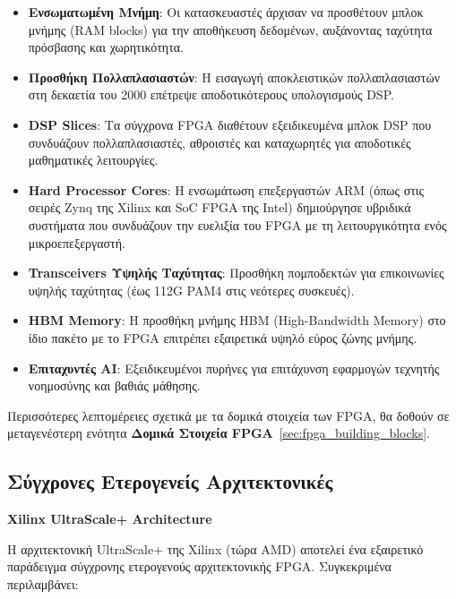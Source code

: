 \begin{itemize}
  \item \textbf{Ενσωματωμένη Μνήμη}: Οι κατασκευαστές άρχισαν να προσθέτουν μπλοκ μνήμης (RAM blocks) για την αποθήκευση δεδομένων, αυξάνοντας ταχύτητα πρόσβασης και χωρητικότητα.
  
  \item \textbf{Προσθήκη Πολλαπλασιαστών}: Η εισαγωγή αποκλειστικών πολλαπλασιαστών στη δεκαετία του 2000 επέτρεψε αποδοτικότερους υπολογισμούς DSP.
  
  \item \textbf{DSP Slices}: Τα σύγχρονα FPGA διαθέτουν εξειδικευμένα μπλοκ DSP που συνδυάζουν πολλαπλασιαστές, αθροιστές και καταχωρητές για αποδοτικές μαθηματικές λειτουργίες.
  
  \item \textbf{Hard Processor Cores}: Η ενσωμάτωση επεξεργαστών ARM (όπως στις σειρές Zynq της Xilinx και SoC FPGA της Intel) δημιούργησε υβριδικά συστήματα που συνδυάζουν την ευελιξία του FPGA με τη λειτουργικότητα ενός μικροεπεξεργαστή.
  
  \item \textbf{Transceivers Υψηλής Ταχύτητας}: Προσθήκη πομποδεκτών για επικοινωνίες υψηλής ταχύτητας (έως 112G PAM4 στις νεότερες συσκευές).
  
  \item \textbf{HBM Memory}: Η προσθήκη μνήμης HBM (High-Bandwidth Memory) στο ίδιο πακέτο με το FPGA επιτρέπει εξαιρετικά υψηλό εύρος ζώνης μνήμης.
  
  \item \textbf{Επιταχυντές ΑΙ}: Εξειδικευμένοι πυρήνες για επιτάχυνση εφαρμογών τεχνητής νοημοσύνης και βαθιάς μάθησης.
\end{itemize}

Περισσότερες λεπτομέρειες σχετικά με τα δομικά στοιχεία των FPGA, θα δοθούν σε μεταγενέστερη ενότητα \textbf{Δομικά Στοιχεία FPGA}~\ref{sec:fpga_building_blocks}.

\subsection{Σύγχρονες Ετερογενείς Αρχιτεκτονικές}

\textbf{Xilinx UltraScale+ Architecture}

Η αρχιτεκτονική UltraScale+ της Xilinx (τώρα AMD) αποτελεί ένα εξαιρετικό παράδειγμα σύγχρονης ετερογενούς αρχιτεκτονικής FPGA. Συγκεκριμένα περιλαμβάνει:

